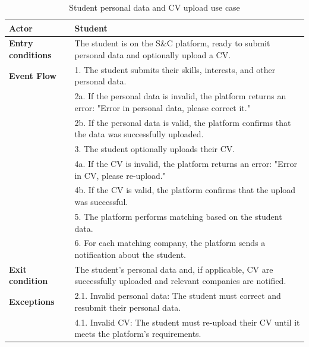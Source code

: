 \begin{table}[h!]
    \centering
    \begin{tabular}{lp{10cm}}
        \textbf{Actor} & Student \\ \hline
        \textbf{Entry conditions} & The student is on the S\&C platform, ready to submit personal data and optionally upload a CV. \\ \hline
        \textbf{Event Flow} & 
        1. The student submits their skills, interests, and other personal data. \\
        & 2a. If the personal data is invalid, the platform returns an error: "Error in personal data, please correct it." \\
        & 2b. If the personal data is valid, the platform confirms that the data was successfully uploaded. \\
        & 3. The student optionally uploads their CV. \\
        & 4a. If the CV is invalid, the platform returns an error: "Error in CV, please re-upload." \\
        & 4b. If the CV is valid, the platform confirms that the upload was successful. \\
        & 5. The platform performs matching based on the student data. \\
        & 6. For each matching company, the platform sends a notification about the student. \\
        \hline
        \textbf{Exit condition} & The student's personal data and, if applicable, CV are successfully uploaded and relevant companies are notified. \\ \hline
        \textbf{Exceptions} & 
        2.1. Invalid personal data: The student must correct and resubmit their personal data. \\
        & 4.1. Invalid CV: The student must re-upload their CV until it meets the platform's requirements. \\
    \end{tabular}
    \caption{Student personal data and CV upload use case}
    \label{tab:student_data_cv_upload}
\end{table}



